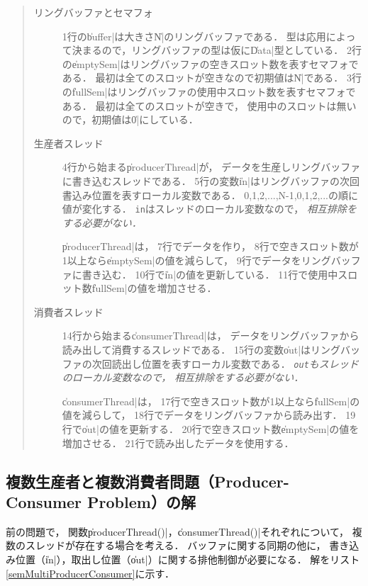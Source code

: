 

\begin{quote}
  \begin{description}
  \item [リングバッファとセマフォ]
    1行の\|buffer|は大きさ\|N|のリングバッファである．
    型は応用によって決まるので，リングバッファの型は仮に\|Data|型としている．
    2行の\|emptySem|はリングバッファの空きスロット数を表すセマフォである．
    最初は全てのスロットが空きなので初期値は\|N|である．
    3行の\|fullSem|はリングバッファの使用中スロット数を表すセマフォである．
    最初は全てのスロットが空きで，
    使用中のスロットは無いので，初期値は\|0|にしている．

  \item [生産者スレッド]
    4行から始まる\|producerThread|が，
    データを生産しリングバッファに書き込むスレッドである．
    5行の変数\|in|はリングバッファの次回書込み位置を表すローカル変数である．
    0,1,2,...,N-1,0,1,2,...の順に値が変化する．
    \texttt{in}はスレッドのローカル変数なので，
    \emph{相互排除をする必要がない．}

    \|producerThread|は，
    7行でデータを作り，
    8行で空きスロット数が1以上なら\|emptySem|の値を減らして，
    9行でデータをリングバッファに書き込む．
    10行で\|in|の値を更新している．
    11行で使用中スロット数\|fullSem|の値を増加させる．

  \item [消費者スレッド]
    14行から始まる\|consumerThread|は，
    データをリングバッファから読み出して消費するスレッドである．
    15行の変数\|out|はリングバッファの次回読出し位置を表すローカル変数である．
    \emph{\texttt{out}もスレッドのローカル変数なので，
      相互排除をする必要がない．}

    \|consumerThread|は，
    17行で空きスロット数が1以上なら\|fullSem|の値を減らして，
    18行でデータをリングバッファから読み出す．
    19行で\|out|の値を更新する．
    20行で空きスロット数\|emptySem|の値を増加させる．
    21行で読み出したデータを使用する．
  \end{description}
\end{quote}

\subsection{複数生産者と複数消費者問題（Producer-Consumer Problem）の解}
前の問題で，
関数\|producerThread()|，\|consumerThread()|それぞれについて，
複数のスレッドが存在する場合を考える．
バッファに関する同期の他に，
書き込み位置（\|in|），取出し位置（\|out|）に関する排他制御が必要になる．
解をリスト\ref{semMultiProducerConsumer}に示す．

